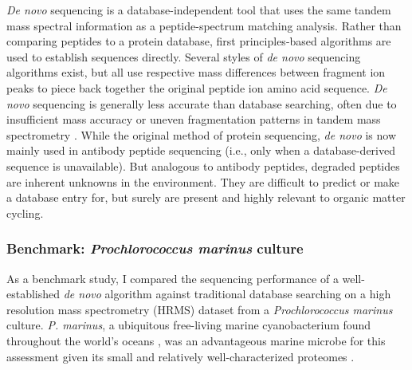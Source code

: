\documentclass[12pt, letterpaper, twoside]{article}
\begin{document}
\textit{De novo} sequencing is a database-independent tool that uses the same tandem mass spectral information as a peptide-spectrum matching analysis. Rather than comparing peptides to a protein database, first principles-based algorithms are used to establish sequences directly. Several styles of \textit{de novo} sequencing algorithms exist, but all use respective mass differences between fragment ion peaks to piece back together the original peptide ion amino acid sequence. \textit{De novo} sequencing is generally less accurate than database searching, often due to insufficient mass accuracy \cite{muth_navigating_2015} or uneven fragmentation patterns in tandem mass spectrometry \cite{lu_algorithms_2004}. While the original method of protein sequencing, \textit{de novo} is now mainly used in antibody peptide sequencing (i.e., only when a database-derived sequence is unavailable). But analogous to antibody peptides, degraded peptides are inherent unknowns in the environment. They are difficult to predict or make a database entry for, but surely are present and highly relevant to organic matter cycling. 

\subsubsection{Benchmark: \textit{Prochlorococcus marinus} culture}

As a benchmark study, I compared the sequencing performance of a well-established \textit{de novo} algorithm against traditional database searching on a high resolution mass spectrometry (HRMS) dataset from a \textit{Prochlorococcus marinus} culture. \textit{P. marinus}, a ubiquitous free-living marine cyanobacterium found throughout the world’s oceans \cite{chisholm_novel_1988}, was an advantageous marine microbe for this assessment given its small and relatively well-characterized proteomes \cite{paul_distinct_2010}.
\end{document}
